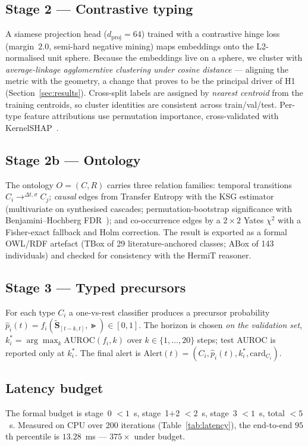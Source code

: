 \subsection{Stage 2 --- Contrastive typing}
A siamese projection head ($d_{\text{proj}}=64$) trained with a contrastive hinge loss
(margin~$2.0$, semi-hard negative mining) maps embeddings onto the L2-normalised unit sphere.
Because the embeddings live on a sphere, we cluster with \emph{average-linkage agglomerative
clustering under cosine distance} --- aligning the metric with the geometry, a change that proves
to be the principal driver of H1 (Section~\ref{sec:results}). Cross-split labels are assigned by
\emph{nearest centroid} from the training centroids, so cluster identities are consistent across
train/val/test. Per-type feature attributions use permutation importance, cross-validated with
KernelSHAP~\cite{lundberg2017}.

\subsection{Stage 2b --- Ontology}
The ontology $O=(C,R)$ carries three relation families: temporal transitions
$C_i\!\to^{\Delta t,\sigma}\!C_j$; \emph{causal} edges from Transfer Entropy with the KSG
estimator~\cite{kraskov2004} (multivariate on synthesised cascades; permutation-bootstrap
significance with Benjamini--Hochberg FDR~\cite{benjamini1995}); and co-occurrence edges by a
$2\times2$ Yates $\chi^2$ with a Fisher-exact fallback and Holm correction. The result is exported
as a formal OWL/RDF artefact (TBox of 29 literature-anchored classes; ABox of 143 individuals) and
checked for consistency with the HermiT reasoner.

\subsection{Stage 3 --- Typed precursors}
For each type $C_i$ a one-vs-rest classifier produces a precursor probability
$\hat{p}_i(t)=f_i(\tilde{\mathbf{S}}_{[t-k,t]},\Gt)\in[0,1]$. The horizon is chosen \emph{on the
validation set}, $k^*_i=\arg\max_k \mathrm{AUROC}(f_i,k)$ over $k\in\{1,\dots,20\}$ steps; test
AUROC is reported only at $k^*_i$. The final alert is
$\mathrm{Alert}(t)=(C_i,\hat{p}_i(t),k^*_i,\text{card}_{C_i})$.

\subsection{Latency budget}
The formal budget is stage~0 $<1$~s, stage~1$+$2 $<2$~s, stage~3 $<1$~s, total $<5$~s. Measured on
CPU over 200 iterations (Table~\ref{tab:latency}), the end-to-end $95$th percentile is $13.28$~ms
--- $375\times$ under budget.

